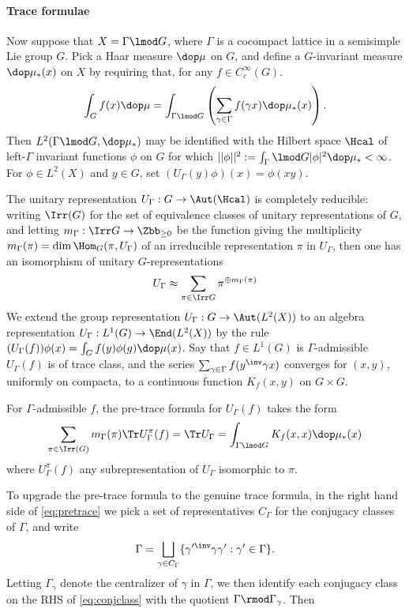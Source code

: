 \paragraph{Trace formulae}
Now suppose that $X = \Gamma \lmod G$,  where $\Gamma$ is a cocompact lattice in a semisimple Lie group $G$. Pick a Haar measure $\dop \mu$ on $G$, and define a $G$-invariant measure $\dop \mu_*(x)$ on $X$ by requiring that, for any $f\in C_c^\infty(G)$.
\begin{align}
    \int_G f(x) \dop \mu =  \int_{\Gamma \lmod G} \left( \sum_{\gamma \in \Gamma} f(\gamma x) \dop \mu_*(x) \right).
\end{align}
Then $L^2(\Gamma \lmod G , \dop \mu_*)$ may be identified with the Hilbert space $\Hcal$ of  left-$\Gamma$ invariant functions $\phi$ on $G$ for which $||\phi||^2:=\int_\Gamma \lmod G |\phi|^2 \dop \mu_* <\infty$. For $\phi \in L^2(X)$ and $y \in G$, set $(U_\Gamma(y)\phi) (x) = \phi(xy)$.

The unitary representation $U_\Gamma:G \to \Aut(\Hcal)$ is completely reducible: writing $\Irr(G)$ for the set of equivalence classes of unitary representations of $G$, and letting $m_\Gamma : \Irr G \to \Zbb_{\geq 0}$ be the function giving the multiplicity $m_\Gamma(\pi)  = \dim \Hom_G (\pi , U_\Gamma)$  of an irreducible representation $\pi$  in $U_\Gamma$, then one has an isomorphism of unitary $G$-representations
\begin{align}
    U_\Gamma \approx \sum_{\pi \in \Irr G} \pi^{\oplus m_\Gamma(\pi)}
\end{align}
We extend the group representation $U_\Gamma : G \to \Aut(L^2(X))$ to an algebra representation $U_\Gamma: L^1(G)\to \End(L^2(X))$ by the rule $(U_\Gamma(f)) \phi(x) = \int_G f(y)\phi(g) \dop \mu (x)$. Say that $f \in L^1(G)$ is $\Gamma$-admissible $U_\Gamma(f)$ is of trace class,  and the series $\sum_{\gamma \in \Gamma}f(y^\inv \gamma x)$ converges for $(x,y)$, uniformly on compacta, to a continuous function $K_f(x,y)$ on $G\times G$.

For $\Gamma$-admissible $f$, the pre-trace formula for $U_\Gamma(f)$ takes the form
\begin{align}\label{eq:pretrace}
    \sum_{\pi \in \Irr(G)} m_\Gamma(\pi) \Tr U_\Gamma^\pi(f) = \Tr U_\Gamma =\int_{\Gamma \lmod G} K_f(x,x) \dop \mu_* (x)
\end{align}
where $U_\Gamma^\pi(f)$ any subrepresentation of $U_\Gamma$ isomorphic to $\pi$.

To upgrade the pre-trace formula to the genuine trace formula, in the right hand side of \ref{eq:pretrace} we pick a set of representatives $C_\Gamma$ for the conjugacy classes of $\Gamma$, and write
\begin{align}\label{eq:conjclass}
    \Gamma = \bigsqcup_{\gamma\in C_\Gamma} \{\gamma'^\inv \gamma \gamma' : \gamma' \in \Gamma\}.
\end{align}
Letting $\Gamma_\gamma$ denote the centralizer of $\gamma$ in $\Gamma$,  we then identify each conjugacy class on the RHS of \ref{eq:conjclass} with the quotient $\Gamma \rmod \Gamma_\gamma$.  Then

